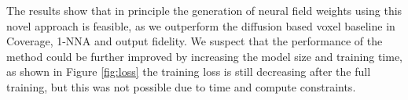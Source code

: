 

The results show that in principle the generation of neural field weights using this novel approach is feasible, as we outperform the diffusion based voxel baseline in Coverage, 1-NNA and output fidelity. We suspect that the performance of the method could be further improved by increasing the model size and training time, as shown in Figure \ref{fig:loss} the training loss is still decreasing after the full training, but this was not possible due to time and compute constraints.


